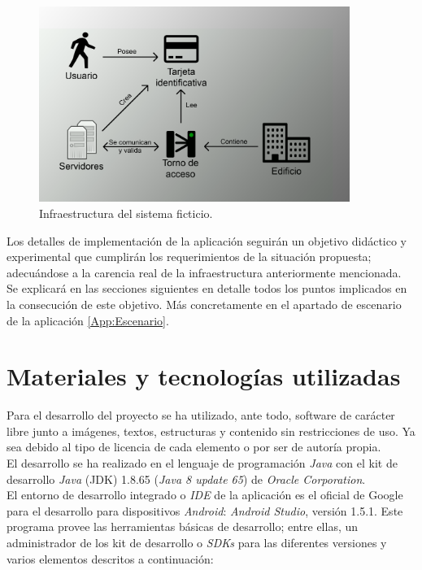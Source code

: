 \documentclass[../PFC.tex]{subfiles}
\begin{document}
\begin{figure}[!ht]
  \centering
  \includegraphics[width=0.9\textwidth]{./img/arquitecturaVirtual}
  \caption{Infraestructura del sistema ficticio.}
  \label{img:infraestructura}
\end{figure}

Los detalles de implementación de la aplicación seguirán un objetivo didáctico y experimental que cumplirán los requerimientos de la situación propuesta; adecuándose a la carencia real de la infraestructura anteriormente mencionada. Se explicará en las secciones siguientes en detalle todos los puntos implicados en la consecución de este objetivo. Más concretamente en el apartado de escenario de la aplicación \ref{App:Escenario}.

\section{Materiales y tecnologías utilizadas}
\label{App:Materiales y tecnologías utilizadas}

Para el desarrollo del proyecto se ha utilizado, ante todo, software de carácter libre junto a imágenes, textos, estructuras y contenido sin restricciones de uso. Ya sea debido al tipo de licencia de cada elemento o por ser de autoría propia.
\*
\vspace{0.5515cm}
\\
El desarrollo se ha realizado en el lenguaje de programación \textit{Java} con el kit de desarrollo \textit{Java} (JDK) 1.8.65 (\textit{Java 8 update 65}) de \textit{Oracle Corporation}\cite{java}.
\*
\vspace{0.5515cm}
\\
El entorno de desarrollo integrado o \textit{IDE} de la aplicación es el oficial de Google para el desarrollo para dispositivos \textit{Android}: \textit{Android Studio}, versión 1.5.1\cite{androidStudio}. Este programa provee las herramientas básicas de desarrollo; entre ellas, un administrador de los kit de desarrollo o \textit{SDKs} para las diferentes versiones y varios elementos descritos a continuación:
\end{document}
